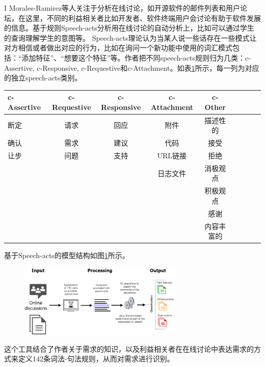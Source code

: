 I Morales-Ramirez等人\cite{Morales2019Speech}关注于分析在线讨论，如开源软件的邮件列表和用户论坛，在这里，不同的利益相关者比如开发者、软件终端用户会讨论有助于软件发展的信息。基于规则Speech-acts分析\cite{morales2014discovering}用在线讨论的自动分析上，比如可以通过学生的查询理解学生的意图\cite{feng2006intelligent}等。 Speech-acts理论认为当某人说一些话存在一些模式让对方相信或者做出对应的行为\cite{acts1969essay}，比如在询问一个新功能中使用的词汇模式包括：“添加特征”、“想要这个特征”等。作者把不同speech-acts规则归为几类：c-Assertive, c-Responsive, c-Requestive和c-Attachment。如表\ref{tab:speech-act0}所示，每一列为对应的独立speech-acts类别。
\begin{table}[htb]
    \label{tab:speech-act0}
    \centering
    \footnotesize%
    \setlength{\tabcolsep}{4pt}%
    \renewcommand{\arraystretch}{1.2}%
\begin{tabular}{lcccccccc}
\hline
c-Assertive & c-Requestive & c-Responsive & c-Attachment & c-Other          \\
\hline
断定        & 请求         & 回应         & 附件         & 描述性的      \\
确认        & 需求         & 建议         & 代码         & 接受           \\
让步        & 问题         & 支持         & URL链接      & 拒绝           \\
            &              &              & 日志文件     & 消极观点 \\
            &              &              &              & 积极观点  \\
            &              &              &              & 感谢            \\
            &              &              &              & 内容丰富的 \\
\hline            
\end{tabular}
\end{table}
基于Speech-acts的模型结构如图\ref{fig:speech-acts1}所示。
\begin{figure}[htb]
    \centering
    \includegraphics[width=0.70\textwidth]{Img/speech-acts1.png}
    \label{fig:speech-acts1}
\end{figure}
这个工具结合了作者关于需求的知识，以及利益相关者在在线讨论中表达需求的方式来定义142条词法-句法规则，从而对需求进行识别。

